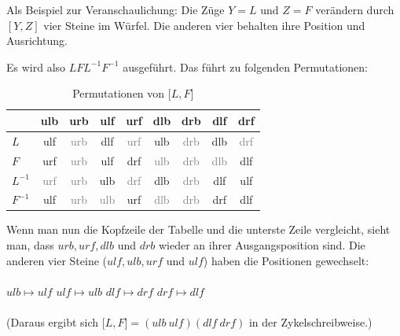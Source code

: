 \documentclass[12pt,a4paper, usenames, dvipsnames]{article}
\begin{document}
Als Beispiel zur Veranschaulichung: Die Züge $Y=L$ und $Z=F$ verändern durch $[Y, Z]$ vier Steine im Würfel. Die anderen vier behalten ihre Position und Ausrichtung. 


Es wird also $LFL^{-1}F^{-1}$ ausgeführt. Das führt zu folgenden Permutationen:

\begin{table}[H]
\centering
\begin{tabular}{lcccccccc}

 & ulb & urb & ulf & urf & dlb & drb & dlf & drf \\

\hline
$L$ & ulf & \textcolor{gray}{urb} & dlf & \textcolor{gray}{urf} & ulb & \textcolor{gray}{drb} & dlb & \textcolor{gray}{drf} \\

$F$ & urf & \textcolor{gray}{urb} & ulf &  drf & \textcolor{gray}{ulb} & \textcolor{gray}{drb} & \textcolor{gray}{dlb} & dlf \\

$L^{-1}$ & \textcolor{gray}{urf} & \textcolor{gray}{urb} & ulb & \textcolor{gray}{drf} & dlb & \textcolor{gray}{drb} & dlf & ulf \\

$F^{-1}$ \: & ulf & \textcolor{gray}{urb} & \textcolor{gray}{ulb} & urf & \textcolor{gray}{dlb} & \textcolor{gray}{drb} & drf & dlf\\

\end{tabular}
\caption[Permutationen von $\lbrack L, F \rbrack $]{Permutationen von $\lbrack L, F \rbrack $ }
\end{table}

Wenn man nun die Kopfzeile der Tabelle und die unterste Zeile vergleicht, sieht man, dass $urb, urf, dlb$ und $drb$ wieder an ihrer Ausgangsposition sind. Die anderen vier Steine ($ulf, ulb, urf$ und $ulf$) haben die Positionen gewechselt: \\
\\
$ulb \mapsto ulf$ \hspace*{2.5cm }$ulf  \mapsto ulb$ \hspace*{2.5cm } $dlf \mapsto drf$ \hspace*{2.5cm } $drf \mapsto dlf$
\\
\\
(Daraus ergibt sich $\lbrack L, F \rbrack  = (ulb \ ulf)(dlf \ drf)$ in der Zykelschreibweise.)

%
%
%
%
%
%
%
%
%
%
%
%
%
%
%
%
%
%
%
%
\end{document}
